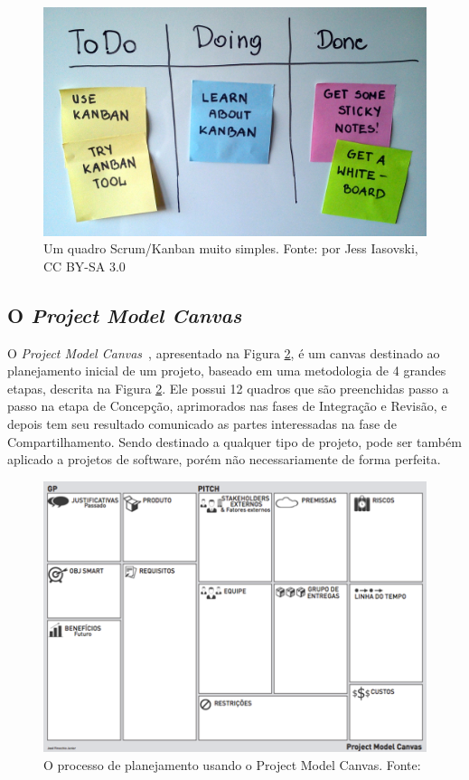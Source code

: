 \documentclass[a4]{report}
\newcommand{\othersize}{0.7\linewidth}
\begin{document}
\begin{figure}
    \centering
    \includegraphics[width=\othersize]{imagens/Simple-kanban-board-.jpg}
    \caption{Um quadro Scrum/Kanban muito simples. Fonte:  por Jess Iasovski, CC BY-SA 3.0 }
    \label{fig:kanban}
\end{figure}

\subsection{O \textit{Project Model Canvas}}

O \textit{Project Model Canvas}~\citep{finocchio:2013}, apresentado na Figura \ref{fig:pmcp}, é um canvas destinado ao planejamento inicial de um projeto, baseado em uma metodologia de 4 grandes etapas, descrita na Figura \ref{fig:pmcp}. Ele possui 12 quadros que são preenchidas passo a passo na etapa de Concepção,  aprimorados nas fases de Integração e Revisão, e depois tem seu resultado comunicado as partes interessadas na fase de Compartilhamento. Sendo destinado a qualquer tipo de projeto, pode ser também aplicado a projetos de software, porém não necessariamente de forma perfeita.

\begin{figure}
    \centering
    \includegraphics[width=\othersize]{imagens/ProjectMdoel Canvas.png}
    \caption{O processo de planejamento usando o Project Model Canvas. Fonte: \citet{finocchio:2013}}
    \label{fig:pmcp}
\end{figure}
\end{document}
